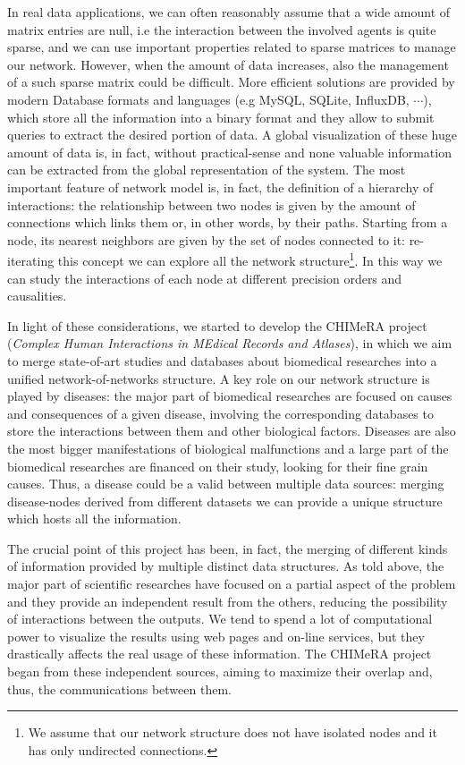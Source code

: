 \documentclass{standalone}
\begin{document}
In real data applications, we can often reasonably assume that a wide amount of matrix entries are null, i.e the interaction between the involved agents is quite sparse, and we can use important properties related to sparse matrices to manage our network.
However, when the amount of data increases, also the management of a such sparse matrix could be difficult.
More efficient solutions are provided by modern Database formats and languages (e.g \textsf{MySQL}, \textsf{SQLite}, \textsf{InfluxDB}, $\cdots$), which store all the information into a binary format and they allow to submit queries to extract the desired portion of data.
A global visualization of these huge amount of data is, in fact, without practical-sense and none valuable information can be extracted from the global representation of the system.
The most important feature of network model is, in fact, the definition of a hierarchy of interactions: the relationship between two nodes is given by the amount of connections which links them or, in other words, by their paths.
Starting from a node, its nearest neighbors are given by the set of nodes connected to it: re-iterating this concept we can explore all the network structure\footnote{
  We assume that our network structure does not have isolated nodes and it has only undirected connections.
}.
In this way we can study the interactions of each node at different precision orders and causalities.

In light of these considerations, we started to develop the \textsf{CHIMeRA} project (\emph{Complex Human Interactions in MEdical Records and Atlases}), in which we aim to merge state-of-art studies and databases about biomedical researches into a unified network-of-networks structure.
A key role on our network structure is played by diseases: the major part of biomedical researches are focused on causes and consequences of a given disease, involving the corresponding databases to store the interactions between them and other biological factors.
Diseases are also the most bigger manifestations of biological malfunctions and a large part of the biomedical researches are financed on their study, looking for their fine grain causes.
Thus, a disease could be a valid  between multiple data sources: merging disease-nodes derived from different datasets we can provide a unique structure which hosts all the information.

The crucial point of this project has been, in fact, the merging of different kinds of information provided by multiple distinct data structures.
As told above, the major part of scientific researches have focused on a partial aspect of the problem and they provide an independent result from the others, reducing the possibility of interactions between the outputs.
We tend to spend a lot of computational power to visualize the results using web pages and on-line services, but they drastically affects the real usage of these information.
The \textsf{CHIMeRA} project began from these independent sources, aiming to maximize their overlap and, thus, the communications between them.
\end{document}
